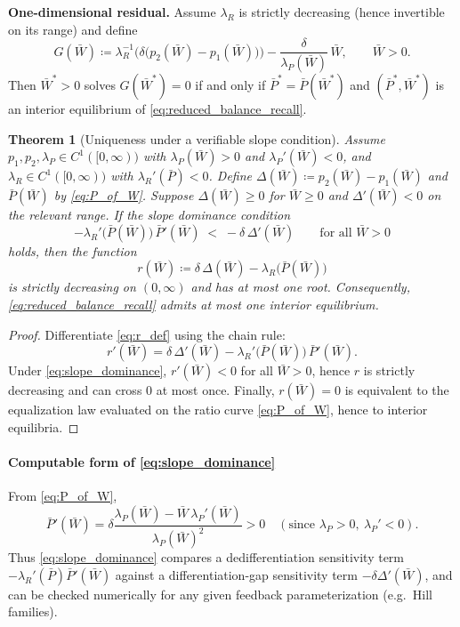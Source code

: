 \documentclass[pdflatex,sn-mathphys-ay]{sn-jnl}
\theoremstyle{thmstyleone}
\newtheorem{theorem}{Theorem}[section]
\theoremstyle{definition}
\theoremstyle{remark}
\begin{document}
\medskip\noindent\textbf{One-dimensional residual.}
Assume $\lambda_R$ is strictly decreasing (hence invertible on its range) and define
\begin{equation}\label{eq:G_def}
G(\bar W) \coloneqq \lambda_R^{-1}\!\Big(\delta\big(p_2(\bar W)-p_1(\bar W)\big)\Big)
-\frac{\delta}{\lambda_P(\bar W)}\,\bar W,\qquad \bar W>0.
\end{equation}
Then $\bar W^*>0$ solves $G(\bar W^*)=0$ if and only if
$\bar P^*=\bar P(\bar W^*)$ and $(\bar P^*,\bar W^*)$ is an interior equilibrium of
\eqref{eq:reduced_balance_recall}.

\begin{theorem}[Uniqueness under a verifiable slope condition]
\label{thm:unique_equilibrium_strong}
Assume $p_1,p_2,\lambda_P\in C^1([0,\infty))$ with $\lambda_P(\bar W)>0$ and $\lambda_P'(\bar W)<0$,
and $\lambda_R\in C^1([0,\infty))$ with $\lambda_R'(\bar P)<0$.
Define $\Delta(\bar W) \coloneqq p_2(\bar W)-p_1(\bar W)$ and $\bar P(\bar W)$ by \eqref{eq:P_of_W}.
Suppose $\Delta(\bar W)\ge 0$ for $\bar W\ge 0$ and $\Delta'(\bar W)<0$ on the relevant range.
If the slope dominance condition
\begin{equation}\label{eq:slope_dominance}
-\lambda_R'\big(\bar P(\bar W)\big)\,\bar P'(\bar W)\;<\;-\delta\,\Delta'(\bar W)
\qquad\text{for all }\bar W>0
\end{equation}
holds, then the function
\begin{equation}\label{eq:r_def}
r(\bar W) \coloneqq \delta\,\Delta(\bar W)-\lambda_R\big(\bar P(\bar W)\big)
\end{equation}
is strictly decreasing on $(0,\infty)$ and has at most one root. Consequently,
\eqref{eq:reduced_balance_recall} admits at most one interior equilibrium.
\end{theorem}

\begin{proof}
Differentiate \eqref{eq:r_def} using the chain rule:
\[
r'(\bar W)=\delta\,\Delta'(\bar W)-\lambda_R'\big(\bar P(\bar W)\big)\,\bar P'(\bar W).
\]
Under \eqref{eq:slope_dominance}, $r'(\bar W)<0$ for all $\bar W>0$, hence $r$ is strictly
decreasing and can cross $0$ at most once. Finally, $r(\bar W)=0$ is equivalent to the equalization
law evaluated on the ratio curve \eqref{eq:P_of_W}, hence to interior equilibria.
\end{proof}

\paragraph{Computable form of \eqref{eq:slope_dominance}}
From \eqref{eq:P_of_W},
\begin{equation}\label{eq:Pprime}
\bar P'(\bar W)=\delta\frac{\lambda_P(\bar W)-\bar W\,\lambda_P'(\bar W)}{\lambda_P(\bar W)^2}>0
\quad(\text{since }\lambda_P>0,\ \lambda_P'<0).
\end{equation}
Thus \eqref{eq:slope_dominance} compares a dedifferentiation sensitivity term
$-\lambda_R'(\bar P)\bar P'(\bar W)$ against a differentiation-gap sensitivity term
$-\delta\Delta'(\bar W)$, and can be checked numerically for any given feedback parameterization
(e.g.\ Hill families).
\end{document}
